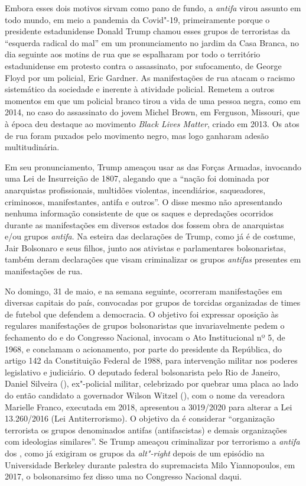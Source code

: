 Embora esses dois motivos sirvam como pano de fundo, a \emph{antifa}
virou assunto em todo mundo, em meio a pandemia da Covid"-19,
primeiramente porque o presidente estadunidense Donald Trump chamou
esses grupos de terroristas da ``esquerda radical do mal'' em um
pronunciamento no jardim da Casa Branca, no dia seguinte aos motins de
rua que se espalharam por todo o território estadunidense em protesto
contra o assassinato, por sufocamento, de George Floyd por um policial,
Eric Gardner. As manifestações de rua atacam o racismo sistemático da
sociedade e inerente à atividade policial. Remetem a outros momentos em
que um policial branco tirou a vida de uma pessoa negra, como em 2014,
no caso do assassinato do jovem Michel Brown, em Ferguson, Missouri, que
à época deu destaque ao movimento \emph{Black Lives Matter}, criado em
2013. Os atos de rua foram puxados pelo movimento negro, mas logo
ganharam adesão multitudinária.

Em seu pronunciamento, Trump ameaçou usar as das Forças Armadas,
invocando uma Lei de Insurreição de 1807, alegando que a ``nação foi
dominada por anarquistas profissionais, multidões violentas,
incendiários, saqueadores, criminosos, manifestantes, antifa e outros''.
O disse mesmo não apresentando nenhuma informação consistente de que os
saques e depredações ocorridos durante as manifestações em diversos
estados dos  fossem obra de anarquistas e/ou grupos \emph{antifa}. Na
esteira das declarações de Trump, como já é de costume, Jair Bolsonaro e
seus filhos, junto aos ativistas e parlamentares bolsonaristas, também
deram declarações que visam criminalizar os grupos \emph{antifas}
presentes em manifestações de rua.

No domingo, 31 de maio, e na semana seguinte, ocorreram manifestações em
diversas capitais do país, convocadas por grupos de torcidas organizadas
de times de futebol que defendem a democracia. O objetivo foi expressar
oposição às regulares manifestações de grupos bolsonaristas que
invariavelmente pedem o fechamento do  e do Congresso Nacional,
invocam o Ato Institucional nº 5, de 1968, e conclamam o acionamento,
por parte do presidente da República, do artigo 142 da Constituição
Federal de 1988, para intervenção militar nos poderes legislativo e
judiciário. O deputado federal bolsonarista pelo Rio de Janeiro, Daniel
Silveira (), ex"-policial militar, celebrizado por quebrar uma placa
ao lado do então candidato a governador Wilson Witzel (), com o nome
da vereadora Marielle Franco, executada em 2018, apresentou a 
3019/2020 para alterar a Lei 13.260/2016 (Lei Antiterrorismo). O
objetivo da  é considerar ``organização terrorista os grupos
denominados antifas (antifascistas) e demais organizações com ideologias
similares''. Se Trump ameaçou criminalizar por terrorismo a
\emph{antifa} dos , como já exigiram os grupos da \emph{alt"-right}
depois de um episódio na Universidade Berkeley durante palestra do
supremacista Milo Yiannopoulos, em 2017, o bolsonarsimo fez disso uma 
no Congresso Nacional daqui.

